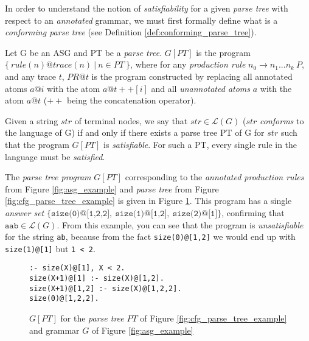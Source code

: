 \noindent
In order to understand the notion of \textit{satisfiability} for a given \textit{parse tree} with respect to an \textit{annotated} grammar, we must first formally define what is a \textit{conforming parse tree} (see Definition \ref{def:conforming_parse_tree}).

\begin{definition}
Let G be an ASG and PT be a \textit{parse tree}. $G[PT]$ is the program $\{\ rule(n)@trace(n)\ |\ n \in PT\ \}$, where for any \textit{production rule} $n_0 \to n_1...n_k\ P$, and any trace $t$, $PR@t$ is the program constructed by replacing all annotated atoms $a@i$ with the atom $a@t++[i]$ and all \textit{unannotated atoms} $a$ with the atom $a@t$ ($++$ being the concatenation operator).
\end{definition}

\begin{definition}
\label{def:conforming_parse_tree}
Given a string $str$ of terminal nodes, we say that $str \in \mathcal{L}(G)$ ($str$ \textit{conforms} to the language of G) if and only if there exists a parse tree PT of G for $str$ such that the program $G[PT]$ is \textit{satisfiable}. For such a PT, every single rule in the language must be \textit{satisfied}.
\end{definition}

\noindent
The \textit{parse tree program} $G[PT]$ corresponding to the \textit{annotated production rules} from Figure \ref{fig:asg_example} and \textit{parse tree} from Figure \ref{fig:cfg_parse_tree_example} is given in Figure \ref{fig:asg_tree_program_example}. This program has a single \textit{answer set} $\{\texttt{size(0)@[1,2,2]},\ \texttt{size(1)@[1,2]},\ \texttt{size(2)@[1]}\}$, confirming that $\texttt{aab} \in \mathcal{L}(G)$. From this example, you can see that the program is \textit{unsatisfiable} for the string \texttt{ab}, because from the fact \texttt{size(0)@[1,2]} we would end up with \texttt{size(1)@[1]} but \texttt{1 < 2}.

\begin{figure}[H]
\centering
\texttt{:- size(X)@[1], X < 2. \\
           size(X+1)@[1] :- size(X)@[1,2]. \\
           size(X+1)@[1,2] :- size(X)@[1,2,2]. \\
           size(0)@[1,2,2].}
\caption{$G[PT]$ for the \textit{parse tree} $PT$ of Figure \ref{fig:cfg_parse_tree_example} and grammar $G$ of Figure \ref{fig:asg_example}}
\label{fig:asg_tree_program_example}
\end{figure}


